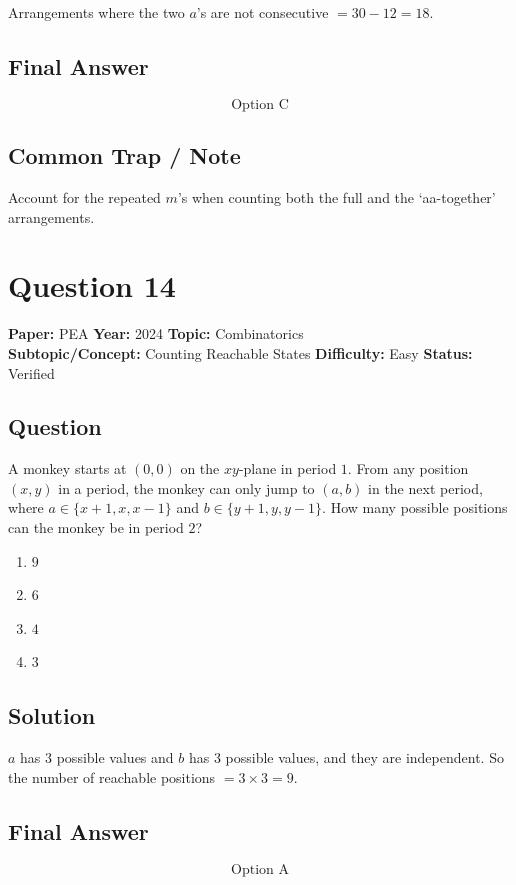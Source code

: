 \documentclass[11pt]{article}
\begin{document}
Arrangements where the two $a$'s are not consecutive $=30-12=18$.

\subsection*{Final Answer}
\[
\boxed{\text{Option C}}
\]

\subsection*{Common Trap / Note}
Account for the repeated $m$'s when counting both the full and the `aa-together' arrangements.

\section*{Question 14}
\textbf{Paper:} PEA \quad \textbf{Year:} 2024 \quad \textbf{Topic:} Combinatorics \\
\textbf{Subtopic/Concept:} Counting Reachable States \quad \textbf{Difficulty:} Easy \quad \textbf{Status:} Verified

\subsection*{Question}
A monkey starts at $(0,0)$ on the $xy$-plane in period $1$. From any position $(x,y)$ in a period, the monkey can only jump to $(a,b)$ in the next period, where $a\in\{x+1,x,x-1\}$ and $b\in\{y+1,y,y-1\}$. How many possible positions can the monkey be in period $2$?
\begin{enumerate}[label=(\Alph*)]
\item $9$
\item $6$
\item $4$
\item $3$
\end{enumerate}

\subsection*{Solution}
$a$ has $3$ possible values and $b$ has $3$ possible values, and they are independent. So the number of reachable positions $=3\times 3=9$.

\subsection*{Final Answer}
\[
\boxed{\text{Option A}}
\]
\end{document}
